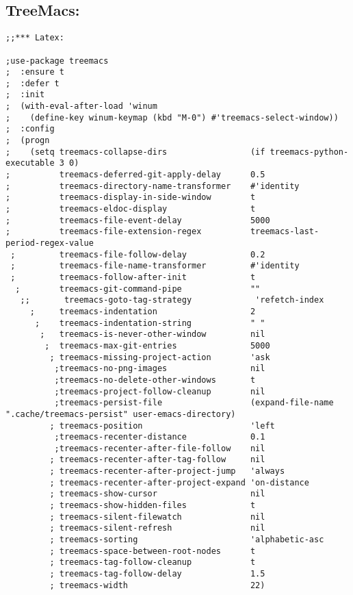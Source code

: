 \documentclass[11pt]{article}
\begin{document}
\subsection{TreeMacs:}
\label{sec:orgc8ab44d}
\begin{verbatim}
;;*** Latex:

;use-package treemacs
;  :ensure t
;  :defer t
;  :init
;  (with-eval-after-load 'winum
;    (define-key winum-keymap (kbd "M-0") #'treemacs-select-window))
;  :config
;  (progn
;    (setq treemacs-collapse-dirs                 (if treemacs-python-executable 3 0)
;          treemacs-deferred-git-apply-delay      0.5
;          treemacs-directory-name-transformer    #'identity
;          treemacs-display-in-side-window        t
;          treemacs-eldoc-display                 t
;          treemacs-file-event-delay              5000
;          treemacs-file-extension-regex          treemacs-last-period-regex-value
 ;         treemacs-file-follow-delay             0.2
 ;         treemacs-file-name-transformer         #'identity
 ;         treemacs-follow-after-init             t
  ;        treemacs-git-command-pipe              ""
   ;;       treemacs-goto-tag-strategy             'refetch-index
     ;     treemacs-indentation                   2
      ;    treemacs-indentation-string            " "
       ;   treemacs-is-never-other-window         nil
        ;  treemacs-max-git-entries               5000
         ; treemacs-missing-project-action        'ask
          ;treemacs-no-png-images                 nil
          ;treemacs-no-delete-other-windows       t
          ;treemacs-project-follow-cleanup        nil
          ;treemacs-persist-file                  (expand-file-name ".cache/treemacs-persist" user-emacs-directory)
         ; treemacs-position                      'left
          ;treemacs-recenter-distance             0.1
          ;treemacs-recenter-after-file-follow    nil
         ; treemacs-recenter-after-tag-follow     nil
         ; treemacs-recenter-after-project-jump   'always
         ; treemacs-recenter-after-project-expand 'on-distance
         ; treemacs-show-cursor                   nil
         ; treemacs-show-hidden-files             t
         ; treemacs-silent-filewatch              nil
         ; treemacs-silent-refresh                nil
         ; treemacs-sorting                       'alphabetic-asc
         ; treemacs-space-between-root-nodes      t
         ; treemacs-tag-follow-cleanup            t
         ; treemacs-tag-follow-delay              1.5
         ; treemacs-width                         22)


\end{verbatim}
\end{document}
